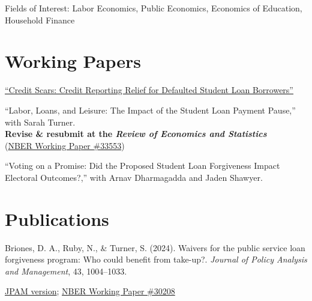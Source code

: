 \documentclass[letterpaper, 11pt]{article}
\renewenvironment{itemize}{
  \begin{list}{}
    { \setlength{\itemsep}{1.2pt} %
      \setlength{\parsep}{0pt}
      \setlength{\topsep}{0pt}
      \setlength{\leftmargin}{0em} } }{
  \end{list}}
\begin{document}
\vspace{0.3cm}
{\large Fields of Interest:} Labor Economics, Public Economics, Economics of Education, Household Finance

\section*{Working Papers}
\begin{itemize}
    \item \href{http://diego-briones.github.io/files/briones_jmp.pdf}{``Credit Scars: Credit Reporting Relief for Defaulted Student Loan Borrowers''}

    \item ``Labor, Loans, and Leisure: The Impact of the Student Loan Payment Pause,'' with Sarah Turner. \\ \textbf{Revise \& resubmit at the \textit{Review of Economics and Statistics}}\\ (\href{https://www.nber.org/papers/w33553}{NBER Working Paper \#33553})

    \item ``Voting on a Promise: Did the Proposed Student Loan Forgiveness Impact Electoral Outcomes?,'' with Arnav Dharmagadda and Jaden Shawyer. 
\end{itemize}

\section*{Publications}
\begin{itemize}
\item Briones, D. A., Ruby, N., \& Turner, S. (2024). Waivers for the public service loan forgiveness program: Who could benefit from take-up?. \textit{Journal of Policy Analysis and Management}, 43, 1004–1033.
    \begin{itemize}
    \item [] \href{https://doi.org/10.1002/pam.22566}{JPAM version}; \href{http://www.nber.org/papers/w30208}{NBER Working Paper \#30208}
    \end{itemize}

\end{itemize}
\end{document}

